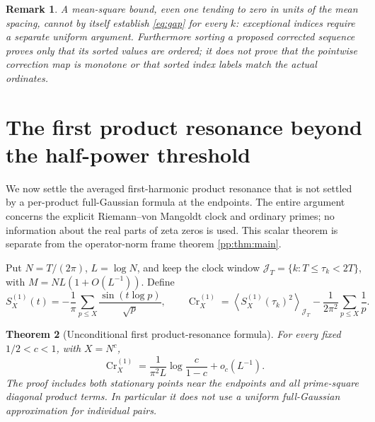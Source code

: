 \documentclass[11pt,reqno]{amsart}
\numberwithin{equation}{section}
\newtheorem{theorem}{Theorem}[section]
\newtheorem{remark}[theorem]{Remark}
\newcommand{\avgJ}[1]{\left\langle #1\right\rangle_{\mathcal J_T}}
\begin{document}
\begin{remark}
A mean-square bound, even one tending to zero in units of the mean spacing, cannot by itself establish \eqref{eq:gap} for every $k$: exceptional indices require a separate uniform argument. Furthermore sorting a proposed corrected sequence proves only that its sorted values are ordered; it does not prove that the pointwise correction map is monotone or that sorted index labels match the actual ordinates.
\end{remark}



\section{The first product resonance beyond the half-power threshold}
\label{sec:C1}
We now settle the averaged first-harmonic product resonance that is not
settled by a per-product full-Gaussian formula at the endpoints.
The entire argument concerns the explicit Riemann--von Mangoldt clock and
ordinary primes; no information about the real parts of zeta zeros is used.
This scalar theorem is separate from the operator-norm frame theorem
\cref{pp:thm:main}.

Put $N=T/(2\pi)$, $L=\log N$, and keep the clock window
$\mathcal J_T=\{k:T\le\tau_k<2T\}$, with
$M=NL(1+O(L^{-1}))$. Define
\begin{equation}\label{eq:C1def}
S_X^{(1)}(t)=-\frac1\pi\sum_{p\le X}\frac{\sin(t\log p)}{\sqrt p},\qquad
\operatorname{Cr}^{(1)}_X=
\avgJ{S_X^{(1)}(\tau_k)^2}-\frac1{2\pi^2}\sum_{p\le X}\frac1p.
\end{equation}

\begin{theorem}[Unconditional first product-resonance formula]
\label{thm:C1}
For every fixed $1/2<c<1$, with $X=N^c$,
\begin{equation}\label{eq:C1}
\operatorname{Cr}^{(1)}_X
=\frac{1}{\pi^2L}\log\frac{c}{1-c}+o_c(L^{-1}).
\end{equation}
The proof includes both stationary points near the endpoints and all
prime-square diagonal product terms. In particular it does not use a
uniform full-Gaussian approximation for individual pairs.
\end{theorem}
\end{document}
